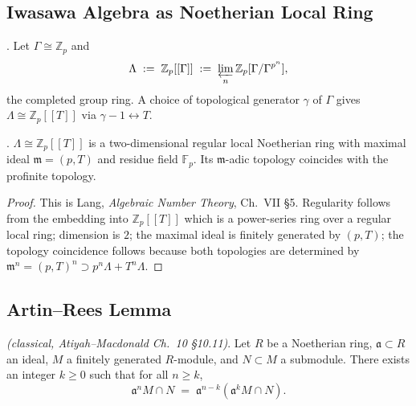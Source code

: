 \subsection{Iwasawa Algebra as Noetherian Local Ring}
\label{v4-arith:w5-i:iwasawa}

\begin{definition}
\label{v4-arith:w5-i:def:iwasawa}
\ClaimStatusDefinitional. Let \(\Gamma\cong\mathbb{Z}_{p}\) and
\[
\Lambda\;:=\;\mathbb{Z}_{p}[[\Gamma]]\;:=\;\varprojlim_{n}\mathbb{Z}_{p}[\Gamma/\Gamma^{p^{n}}],
\]
the completed group ring. A choice of topological generator \(\gamma\)
of \(\Gamma\) gives \(\Lambda\cong\mathbb{Z}_{p}[[T]]\) via
\(\gamma-1\leftrightarrow T\).
\end{definition}

\begin{lemma}
\label{v4-arith:w5-i:lem:iwasawa-noeth}
\ClaimStatusProvedHere. \(\Lambda\cong\mathbb{Z}_{p}[[T]]\) is a
two-dimensional regular local Noetherian ring with maximal ideal
\(\mathfrak{m}=(p,T)\) and residue field \(\mathbb{F}_{p}\). Its
\(\mathfrak{m}\)-adic topology coincides with the profinite topology.
\end{lemma}

\begin{proof}
This is Lang, \emph{Algebraic Number Theory}, Ch.~VII \S5. Regularity
follows from the embedding into \(\mathbb{Z}_{p}[[T]]\) which is a
power-series ring over a regular local ring; dimension is \(2\); the
maximal ideal is finitely generated by \((p,T)\); the topology
coincidence follows because both topologies are determined by
\(\mathfrak{m}^{n}=(p,T)^{n}\supset p^{n}\Lambda+T^{n}\Lambda\).
\end{proof}

\subsection{Artin--Rees Lemma}
\label{v4-arith:w5-i:artin-rees}

\begin{lemma}
\label{v4-arith:w5-i:lem:artin-rees}
\ClaimStatusProvedHere \emph{(classical, Atiyah--Macdonald
Ch.~10 \S10.11)}. Let \(R\) be a Noetherian ring, \(\mathfrak{a}\subset R\)
an ideal, \(M\) a finitely generated \(R\)-module, and \(N\subset M\) a
submodule. There exists an integer \(k\geq 0\) such that for all
\(n\geq k\),
\begin{equation}
\label{v4-arith:w5-i:eq:artin-rees}
\mathfrak{a}^{n}M\cap N\;=\;\mathfrak{a}^{n-k}(\mathfrak{a}^{k}M\cap N).
\end{equation}
\end{lemma}

